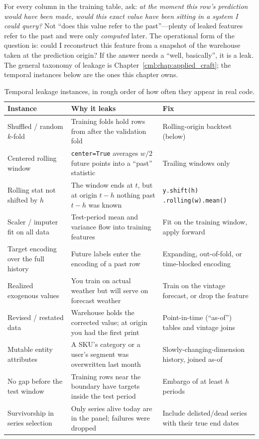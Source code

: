 \begin{keyinsight}
For every column in the training table, ask: \emph{at the moment this row's prediction would have been made, would this exact value have been sitting in a system I could query?} Not ``does this value refer to the past''---plenty of leaked features refer to the past and were only \emph{computed} later. The operational form of the question is: could I reconstruct this feature from a snapshot of the warehouse taken at the prediction origin? If the answer needs a ``well, basically'', it is a leak. The general taxonomy of leakage is Chapter~\ref{cml:chap:applied_craft}; the temporal instances below are the ones this chapter owns.
\end{keyinsight}

\begin{table}[H]\centering
\caption{Temporal leakage instances, in rough order of how often they appear in real code.}
\label{cml:tab:ts_leakage}
\begin{tabularx}{\textwidth}{@{}>{\raggedright\arraybackslash}p{} X X@{}}
\toprule
\textbf{Instance} & \textbf{Why it leaks} & \textbf{Fix} \\
\midrule
Shuffled / random $k$-fold & Training folds hold rows from after the validation fold & Rolling-origin backtest (below) \\
Centered rolling window & \texttt{center=True} averages $w/2$ future points into a ``past'' statistic & Trailing windows only \\
Rolling stat not shifted by $h$ & The window ends at $t$, but at origin $t-h$ nothing past $t-h$ was known & \texttt{y.shift(h)} \texttt{.rolling(w).mean()} \\
Scaler / imputer fit on all data & Test-period mean and variance flow into training features & Fit on the training window, apply forward \\
Target encoding over the full history & Future labels enter the encoding of a past row & Expanding, out-of-fold, or time-blocked encoding \\
Realized exogenous values & You train on actual weather but will serve on forecast weather & Train on the vintage forecast, or drop the feature \\
Revised / restated data & Warehouse holds the corrected value; at origin you had the first print & Point-in-time (``as-of'') tables and vintage joins \\
Mutable entity attributes & A SKU's category or a user's segment was overwritten last month & Slowly-changing-dimension history, joined as-of \\
No gap before the test window & Training rows near the boundary have targets inside the test period & Embargo of at least $h$ periods \\
Survivorship in series selection & Only series alive today are in the panel; failures were dropped & Include delisted/dead series with their true end dates \\
\bottomrule
\end{tabularx}
\end{table}

